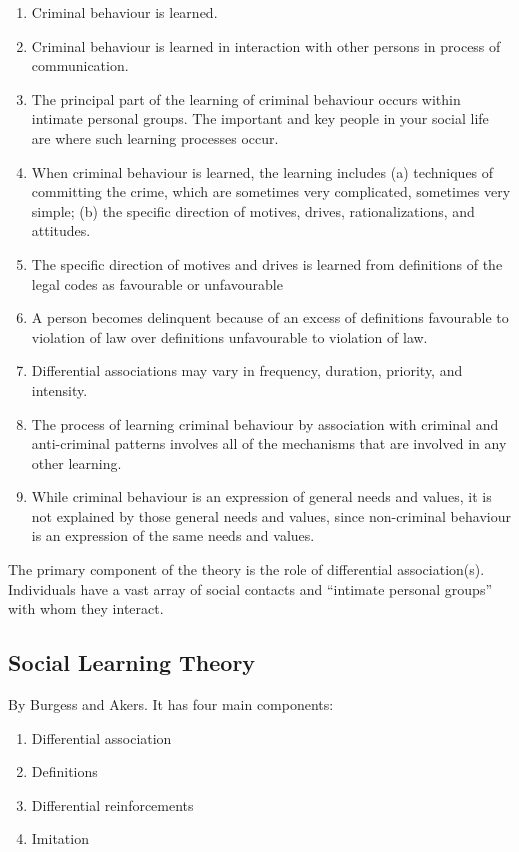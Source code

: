 \documentclass{article}
\begin{document}
\begin{enumerate}
    \item Criminal behaviour is learned.
    \item Criminal behaviour is learned in interaction with other persons in process of communication.
    \item The principal part of the learning of criminal behaviour occurs within intimate personal groups. The important and key people in your social life are where such learning processes occur.
    \item When criminal behaviour is learned, the learning includes (a) techniques of committing the crime, which are sometimes very complicated, sometimes very simple; (b) the specific direction of motives, drives, rationalizations, and attitudes.
    \item The specific direction of motives and drives is learned from definitions of the legal codes as favourable or unfavourable
    \item A person becomes delinquent because of an excess of definitions favourable to violation of law over definitions unfavourable to violation of law.
    \item Differential associations may vary in frequency, duration, priority, and intensity.
    \item The process of learning criminal behaviour by association with criminal and anti-criminal patterns involves all of the mechanisms that are involved in any other learning.
    \item While criminal behaviour is an expression of general needs and values, it is not explained by those general needs and values, since non-criminal behaviour is an expression of the same needs and values.
\end{enumerate}

The primary component of the theory is the role of differential association(s). Individuals have a vast array of social contacts and “intimate personal groups” with whom they interact.

\subsection{Social Learning Theory}
By Burgess and Akers. It has four main components:

\begin{enumerate}
    \item Differential association
    \item Definitions
    \item Differential reinforcements
    \item Imitation
\end{enumerate}
\end{document}
